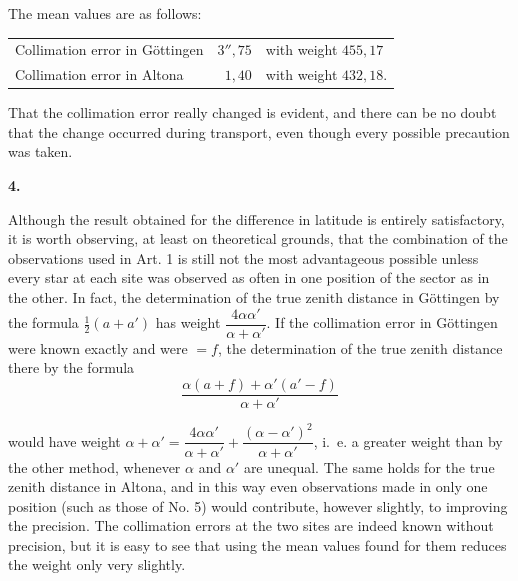 The mean values are as follows:
\begin{center}
\begin{tabular}{@{}l@{\qquad}r@{\enspace}l@{}}
Collimation error in Göttingen & \(3''{,}75\) & with weight \(455{,}17\)\\
Collimation error in Altona & \(1{,}40\) & with weight \(432{,}18\).
\end{tabular}
\end{center}

That the collimation error really changed is evident, and there can be
no doubt that the change occurred during transport, even though every
possible precaution was taken.

\begin{center}\textbf{4.}\end{center}

Although the result obtained for the difference in latitude is entirely
satisfactory, it is worth observing, at least on theoretical grounds,
that the combination of the observations used in Art. 1 is still not
the most advantageous possible unless every star at each site was observed
as often in one position of the sector as in the other. In fact, the
determination of the true zenith distance in Göttingen
by the formula \(\tfrac12(a+a')\) has weight
\(\dfrac{4\alpha\alpha'}{\alpha+\alpha'}\). If the collimation error in Göttingen were known exactly
and were \(=f\),
the determination of the true zenith distance there by the formula
\[
\frac{\alpha(a+f)+\alpha'(a'-f)}{\alpha+\alpha'}
\]

\par\clearpage
\noindent\makebox[12mm][l]{}\par\medskip

\noindent would have weight \(\alpha+\alpha'=\dfrac{4\alpha\alpha'}{\alpha+\alpha'}+
\dfrac{(\alpha-\alpha')^2}{\alpha+\alpha'}\), i.\ e. a greater weight than by the
other method, whenever \(\alpha\) and \(\alpha'\) are unequal. The same holds for
the true zenith distance in Altona, and in this way even observations made
in only one position (such as those of No. 5) would contribute, however slightly,
to improving the precision. The collimation errors at the two sites are
indeed known without  precision, but it is easy
to see that using the mean values found for them reduces the weight
only very slightly.

